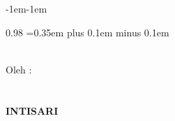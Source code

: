 \clearpage
{}
{}

\begin{adjustwidth}{-1em}{-1em} %
    \begin{spacing}{0.98} %
        \begingroup
        \spaceskip=0.35em plus 0.1em minus 0.1em %
        \setlength{\parindent}{2em} %
        \setlength{\parskip}{0.5em} %

        \begin{center}
            \textbf{\large{\judulid}}\\[0.5cm]
            Oleh :\\
            \penulis\\
            \nim\\[2em]
            \textbf{INTISARI}\\[0.5cm]
        \end{center}


\end{spacing}
\end{adjustwidth}
